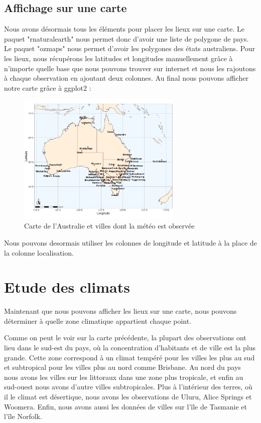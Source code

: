 \documentclass{article}
\begin{document}
\subsection{Affichage sur une carte}

Nous avons désormais tous les éléments pour placer les lieux sur une carte. Le paquet "rnaturalearth" nous permet donc d'avoir une liste de polygone de pays. Le paquet "ozmaps" nous permet d'avoir les polygones des états australiens. Pour les lieux, nous récupérons les latitudes et longitudes manuellement grâce à n'importe quelle base que nous pouvons trouver sur internet et nous les rajoutons à chaque observation en ajoutant deux colonnes. Au final nous pouvons afficher notre carte grâce à ggplot2 : 

\begin{figure}[H]
    \centering
    \includegraphics[width=0.7\textwidth]{Images/Cartographie/Australia_full_map.png}
    \caption{Carte de l'Australie et villes dont la météo est observée}
\end{figure}

Nous pouvons desormais utiliser les colonnes de longitude et latitude à la place de la colonne localisation. 

\section{Etude des climats}

Maintenant que nous pouvons afficher les lieux sur une carte, nous pouvons déterminer à quelle zone climatique appartient chaque point.

Comme on peut le voir sur la carte précédente, la plupart des observations ont lieu dans le sud-est du pays, où la concentration d'habitants et de ville est la plus grande. Cette zone correspond à un climat tempéré pour les villes les plus au sud et subtropical pour les villes plus au nord comme Brisbane. Au nord du pays nous avons les villes sur les littoraux dans une zone plus tropicale, et enfin au sud-ouest nous avons d'autre villes subtropicales. Plus à l'intérieur des terres, où il le climat est désertique, nous avons les observations de Uluru, Alice Springs et Woomera. Enfin, nous avons aussi les données de villes sur l'île de Tasmanie et l'île Norfolk. 
\end{document}
